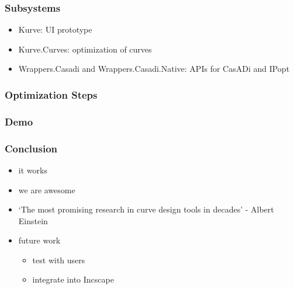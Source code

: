 \documentclass[mathserif]{beamer}
\begin{document}
		\begin{frame}
			\frametitle{Subsystems}
			\begin{itemize}
				\item Kurve: UI prototype
				\item Kurve.Curves: optimization of curves
				\item Wrappers.Casadi and Wrappers.Casadi.Native: APIs for CasADi and IPopt
			\end{itemize}
		\end{frame}
		
		\begin{frame}
			\frametitle{Optimization Steps}
		\end{frame}
		
		
		\begin{frame}
			\frametitle{Demo}
		\end{frame}
		
		\begin{frame}
			\frametitle{Conclusion}
			\begin{itemize}
				\item it works
				\item we are awesome
				\item `The most promising research in curve design tools in decades' - Albert Einstein
				\item future work
				\begin{itemize}
					\item test with users
					\item integrate into Incscape
				\end{itemize}
			\end{itemize}
		\end{frame}
\end{document}
